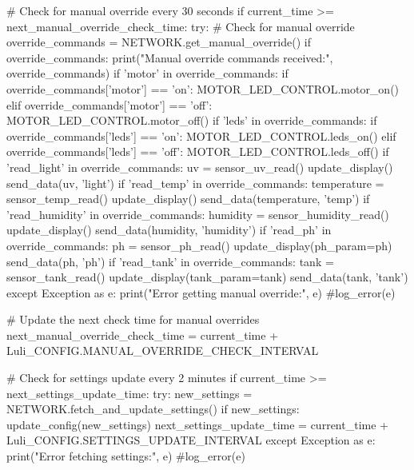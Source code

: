 \documentclass[12pt]{article} %
\begin{document}
\begin{pythoncode}[caption={Main MicroPython Code}]
            # Check for manual override every 30 seconds
            if current_time >= next_manual_override_check_time:
                try:
                    # Check for manual override
                    override_commands = NETWORK.get_manual_override()
                    if override_commands:
                        print("Manual override commands received:", override_commands)
                        if 'motor' in override_commands:
                            if override_commands['motor'] == 'on':
                                MOTOR_LED_CONTROL.motor_on()
                            elif override_commands['motor'] == 'off':
                                MOTOR_LED_CONTROL.motor_off()
                        if 'leds' in override_commands:
                            if override_commands['leds'] == 'on':
                                MOTOR_LED_CONTROL.leds_on()
                            elif override_commands['leds'] == 'off':
                                MOTOR_LED_CONTROL.leds_off()
                        if 'read_light' in override_commands:
                            uv = sensor_uv_read()
                            update_display()
                            send_data(uv, 'light')
                        if 'read_temp' in override_commands:
                            temperature = sensor_temp_read()
                            update_display()
                            send_data(temperature, 'temp')
                        if 'read_humidity' in override_commands:
                            humidity = sensor_humidity_read()
                            update_display()
                            send_data(humidity, 'humidity')
                        if 'read_ph' in override_commands:
                            ph = sensor_ph_read()
                            update_display(ph_param=ph)
                            send_data(ph, 'ph')
                        if 'read_tank' in override_commands:
                            tank = sensor_tank_read()
                            update_display(tank_param=tank)
                            send_data(tank, 'tank')
                except Exception as e:
                    print("Error getting manual override:", e)
                    #log_error(e)
                
                # Update the next check time for manual overrides
                next_manual_override_check_time = current_time + Luli_CONFIG.MANUAL_OVERRIDE_CHECK_INTERVAL
            
            # Check for settings update every 2 minutes
            if current_time >= next_settings_update_time:
                try:
                    new_settings = NETWORK.fetch_and_update_settings()
                    if new_settings:
                        update_config(new_settings)
                    next_settings_update_time = current_time + Luli_CONFIG.SETTINGS_UPDATE_INTERVAL
                except Exception as e:
                    print("Error fetching settings:", e)
                    #log_error(e)


\end{pythoncode}
\end{document}
